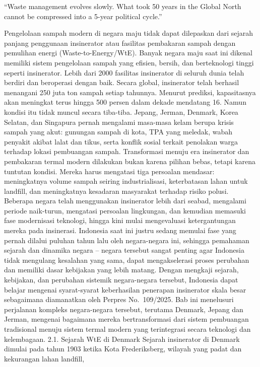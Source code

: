 \documentclass[
  letterpaper,
  DIV=11,
  numbers=noendperiod]{scrreprt}
\begin{document}
``Waste management evolves slowly. What took 50 years in the Global
North cannot be compressed into a 5-year political cycle.''

Pengelolaan sampah modern di negara maju tidak dapat dilepaskan dari
sejarah panjang penggunaan insinerator atau fasilitas pembakaran sampah
dengan pemulihan energi (Waste-to-Energy/WtE). Banyak negara maju saat
ini dikenal memiliki sistem pengelolaan sampah yang efisien, bersih, dan
berteknologi tinggi seperti insinerator. Lebih dari 2000 fasilitas
insinerator di seluruh dunia telah berdiri dan beroperasi dengan baik.
Secara global, insinerator telah berhasil menangani 250 juta ton sampah
setiap tahunnya. Menurut prediksi, kapasitasnya akan meningkat terus
hingga 500 persen dalam dekade mendatang 16. Namun kondisi itu tidak
muncul secara tiba-tiba. Jepang, Jerman, Denmark, Korea Selatan, dan
Singapura pernah mengalami masa-masa kelam berupa krisis sampah yang
akut: gunungan sampah di kota, TPA yang meledak, wabah penyakit akibat
lalat dan tikus, serta konflik sosial terkait penolakan warga terhadap
lokasi pembuangan sampah. Transformasi menuju era insinerator dan
pembakaran termal modern dilakukan bukan karena pilihan bebas, tetapi
karena tuntutan kondisi. Mereka harus mengatasi tiga persoalan mendasar:
meningkatnya volume sampah seiring industrialisasi, keterbatasan lahan
untuk landfill, dan meningkatnya kesadaran masyarakat terhadap risiko
polusi. Beberapa negara telah menggunakan insinerator lebih dari seabad,
mengalami periode naik-turun, mengatasi persoalan lingkungan, dan
kemudian memasuki fase modernisasi teknologi, hingga kini mulai
mengevaluasi ketergantungan mereka pada insinerasi. Indonesia saat ini
justru sedang memulai fase yang pernah dilalui puluhan tahun lalu oleh
negara-negara ini, sehingga pemahaman sejarah dan dinamika negara --
negara tersebut sangat penting agar Indonesia tidak mengulang kesalahan
yang sama, dapat mengakselerasi proses perubahan dan memiliki dasar
kebijakan yang lebih matang. Dengan mengkaji sejarah, kebijakan, dan
perubahan sistemik negara-negara tersebut, Indonesia dapat belajar
mengenai syarat-syarat keberhasilan penerapan insinerator skala besar
sebagaimana diamanatkan oleh Perpres No.~109/2025. Bab ini menelusuri
perjalanan kompleks negara-negara tersebut, terutama Denmark, Jepang dan
Jerman, mengenai bagaimana mereka bertransformasi dari sistem pembuangan
tradisional menuju sistem termal modern yang terintegrasi secara
teknologi dan kelembagaan. 2.1. Sejarah WtE di Denmark Sejarah
insinerator di Denmark dimulai pada tahun 1903 ketika Kota
Frederiksberg, wilayah yang padat dan kekurangan lahan landfill,
\end{document}
